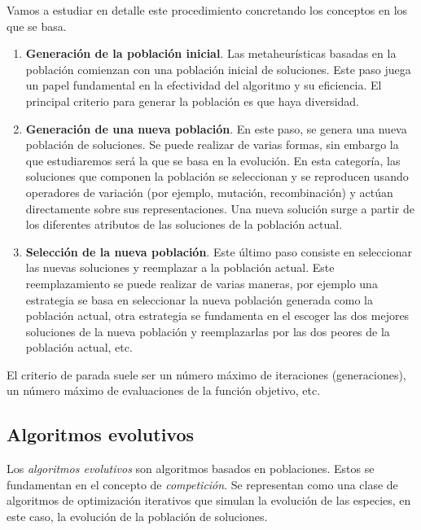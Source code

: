 Vamos a estudiar en detalle este procedimiento concretando los conceptos en los que se basa.

\begin{enumerate}
    \item \textbf{Generación de la población inicial}. Las metaheurísticas basadas en la población comienzan con una población inicial de soluciones. Este paso juega un papel fundamental en la efectividad del algoritmo y su eficiencia. El principal criterio para generar la población es que haya diversidad.
    \item \textbf{Generación de una nueva población}. En este paso, se genera una nueva población de soluciones. Se puede realizar de varias formas, sin embargo la que estudiaremos será la que se basa en la evolución. En esta categoría, las soluciones que componen la población se seleccionan y se reproducen usando operadores de variación (por ejemplo, mutación, recombinación) y actúan directamente sobre sus representaciones. Una nueva solución surge a partir de los diferentes atributos de las soluciones de la población actual.
    \item \textbf{Selección de la nueva población}. Este último paso consiste en seleccionar las nuevas soluciones y reemplazar a la población actual. Este reemplazamiento se puede realizar de varias maneras, por ejemplo una estrategia se basa en seleccionar la nueva población generada como la población actual, otra estrategia se fundamenta en el escoger las dos mejores soluciones de la nueva población y reemplazarlas por las dos peores de la población actual, etc.
\end{enumerate}

El criterio de parada suele ser un número máximo de iteraciones (generaciones), un número máximo de evaluaciones de la función objetivo, etc.

\subsection{Algoritmos evolutivos}

Los \emph{algoritmos evolutivos} son algoritmos basados en poblaciones. Estos se fundamentan en el concepto de \emph{competición}. Se representan como una clase de algoritmos de optimización iterativos que simulan la evolución de las especies, en este caso, la evolución de la población de soluciones.

